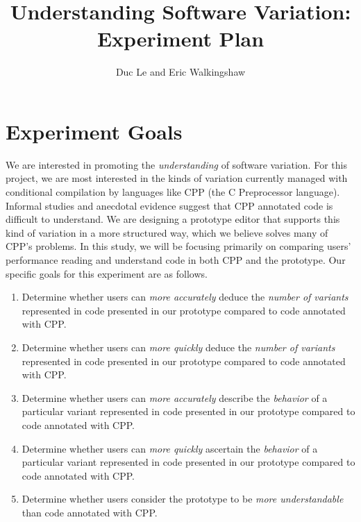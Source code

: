 \documentclass[11pt]{article}
\begin{document}
\title{Understanding Software Variation: Experiment Plan}
\author{Duc Le and Eric Walkingshaw}
\date{}
\maketitle

\section{Experiment Goals}
\label{sec:goals}

We are interested in promoting the \emph{understanding} of software variation.
For this project, we are most interested in the kinds of variation currently
managed with conditional compilation by languages like CPP (the C Preprocessor
language).  Informal studies and anecdotal evidence suggest that CPP annotated
code is difficult to understand.  We are designing a prototype editor that
supports this kind of variation in a more structured way, which we believe
solves many of CPP's problems.  In this study, we will be focusing primarily on
comparing users' performance reading and understand code in both CPP and the
prototype.
%
Our specific goals for this experiment are as follows.

\begin{enumerate}[label=Goal \arabic*:,leftmargin=*]%

\item Determine whether users can \emph{more accurately} deduce the
\emph{number of variants} represented in code presented in our prototype
compared to code annotated with CPP.

\item Determine whether users can \emph{more quickly} deduce the \emph{number
of variants} represented in code presented in our prototype compared to code
annotated with CPP.

\item Determine whether users can \emph{more accurately} describe the
\emph{behavior} of a particular variant represented in code presented in our
prototype compared to code annotated with CPP.

\item Determine whether users can \emph{more quickly} ascertain the
\emph{behavior} of a particular variant represented in code presented in our
prototype compared to code annotated with CPP.

\item Determine whether users consider the prototype to be \emph{more
understandable} than code annotated with CPP.

\end{enumerate}
\end{document}
